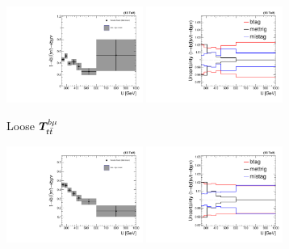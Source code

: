 \begin{figure}[]
    \begin{center}
        \begin{subfigure}[t]{0.49\textwidth}
            \includegraphics[width=0.49\textwidth]{figures/monotop/xfer/rfactor_singlemuontop_loose.pdf}
            \includegraphics[width=0.49\textwidth]{figures/monotop/uncertainties/variations_singlemuontop_loose.pdf}
            \caption{Loose $\bm{T}^{b\mu}_{t\bar{t}}$}
        \end{subfigure}
        \begin{subfigure}[t]{0.49\textwidth}
            \includegraphics[width=0.49\textwidth]{figures/monotop/xfer/rfactor_singlemuontop.pdf}
            \includegraphics[width=0.49\textwidth]{figures/monotop/uncertainties/variations_singlemuontop.pdf}

\end{subfigure}
\end{center}
\end{figure}
